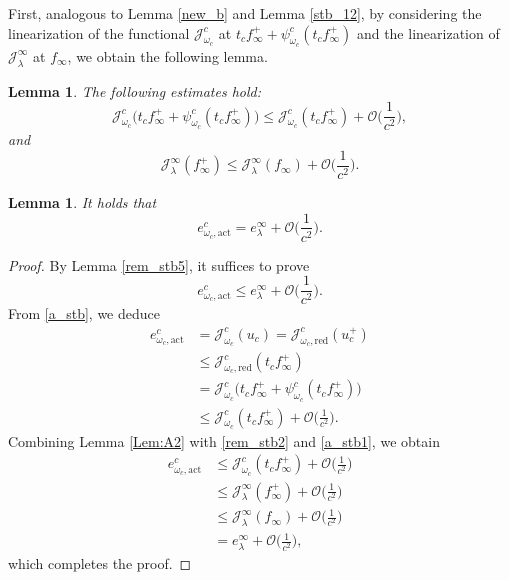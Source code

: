 \documentclass{amsart}
\theoremstyle{plain}
\newtheorem{lemma}[theorem]{Lemma}
\theoremstyle{definition}
\theoremstyle{remark}
\numberwithin{equation}{section} \numberwithin{figure}{section}
\begin{document}
First, analogous to Lemma \ref{new_b} and Lemma \ref{stb_12}, by considering the linearization of the functional $\mathcal{J}^c_{\omega_c}$ at \( t_c f_\infty^+ + \psi_{\omega_c}^c(t_c f_\infty^+) \) and the linearization of \(\mathcal{J}_\lambda^\infty\) at \( f_\infty \), we obtain the following lemma.
\begin{lemma}\label{s_stb3}
The following estimates hold:
\begin{equation}\label{a_stb}
    \mathcal{J}^c_{\omega_c}\bigl(t_c f_\infty^+ + \psi_{\omega_c}^c(t_c f_\infty^+)\bigr) \leq \mathcal{J}^c_{\omega_c}(t_c f_\infty^+) + \mathcal{O}\biggl(\frac{1}{c^2}\biggr),
\end{equation}
and
\begin{equation}\label{a_stb1}
    \mathcal{J}_\lambda^\infty(f_\infty^+) \leq \mathcal{J}_\lambda^\infty(f_\infty) + \mathcal{O}\biggl(\frac{1}{c^2}\biggr).
\end{equation}
\end{lemma}

\begin{lemma}\label{s_stb5}
    It holds that 
    \[
    e_{\omega_c, \mathrm{act}}^c = e_{\lambda}^\infty + \mathcal{O}\biggl(\frac{1}{c^2}\biggr).
    \]
\end{lemma}

\begin{proof}
By Lemma \ref{rem_stb5}, it suffices to prove
\begin{equation}\label{rem_stb6}
    e_{\omega_c, \mathrm{act}}^c \leq e_{\lambda}^\infty + \mathcal{O}\biggl(\frac{1}{c^2}\biggr).
\end{equation}
From \eqref{a_stb}, we deduce
\begin{equation}
\begin{split}
    e_{\omega_c, \mathrm{act}}^c 
    &= \mathcal{J}^c_{\omega_c}(u_c) 
    = \mathcal{J}^c_{\omega_c, \mathrm{red}}(u_c^+) \\
    &\leq \mathcal{J}^c_{\omega_c, \mathrm{red}}(t_c f_\infty^+) \\
    &= \mathcal{J}^c_{\omega_c}\bigl(t_c f_\infty^+ + \psi_{\omega_c}^c(t_c f_\infty^+)\bigr) \\
    &\leq \mathcal{J}^c_{\omega_c}(t_c f_\infty^+) + \mathcal{O}\biggl(\frac{1}{c^2}\biggr).
\end{split}
\end{equation}
Combining Lemma \ref{Lem:A2} with \eqref{rem_stb2} and \eqref{a_stb1}, we obtain
\begin{equation*}
\begin{split}
    e_{\omega_c, \mathrm{act}}^c 
    &\leq \mathcal{J}^c_{\omega_c}(t_c f_\infty^+) + \mathcal{O}\biggl(\frac{1}{c^2}\biggr) \\
    &\leq \mathcal{J}_\lambda^\infty(f_\infty^+) + \mathcal{O}\biggl(\frac{1}{c^2}\biggr) \\
    &\leq \mathcal{J}_\lambda^\infty(f_\infty) + \mathcal{O}\biggl(\frac{1}{c^2}\biggr) \\
    &= e_\lambda^\infty + \mathcal{O}\biggl(\frac{1}{c^2}\biggr),
\end{split}
\end{equation*}
which completes the proof.
\end{proof}
\end{document}
